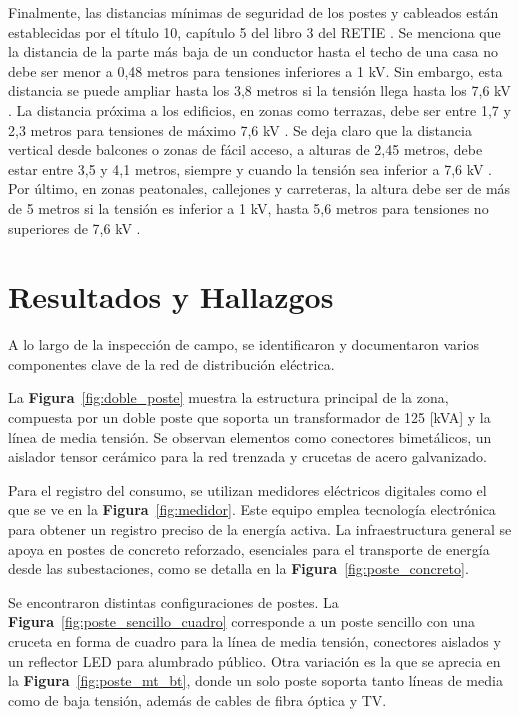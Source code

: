 Finalmente, las distancias mínimas de seguridad de los postes y cableados están establecidas por el título 10, capítulo 5 del libro 3 del RETIE \cite{retie_2013}. Se menciona que la distancia de la parte más baja de un conductor hasta el techo de una casa no debe ser menor a 0,48 metros para tensiones inferiores a 1 kV. Sin embargo, esta distancia se puede ampliar hasta los 3,8 metros si la tensión llega hasta los 7,6 kV \cite{retie_2013}. La distancia próxima a los edificios, en zonas como terrazas, debe ser entre 1,7 y 2,3 metros para tensiones de máximo 7,6 kV \cite{retie_2013}. Se deja claro que la distancia vertical desde balcones o zonas de fácil acceso, a alturas de 2,45 metros, debe estar entre 3,5 y 4,1 metros, siempre y cuando la tensión sea inferior a 7,6 kV \cite{retie_2013}. Por último, en zonas peatonales, callejones y carreteras, la altura debe ser de más de 5 metros si la tensión es inferior a 1 kV, hasta 5,6 metros para tensiones no superiores de 7,6 kV \cite{retie_2013}.


\section{Resultados y Hallazgos}

A lo largo de la inspección de campo, se identificaron y documentaron varios componentes clave de la red de distribución eléctrica. 

La \textbf{Figura}~\ref{fig:doble_poste} muestra la estructura principal de la zona, compuesta por un doble poste que soporta un transformador de 125 [kVA] y la línea de media tensión. Se observan elementos como conectores bimetálicos, un aislador tensor cerámico para la red trenzada y crucetas de acero galvanizado.

Para el registro del consumo, se utilizan medidores eléctricos digitales como el que se ve en la \textbf{Figura}~\ref{fig:medidor}. Este equipo emplea tecnología electrónica para obtener un registro preciso de la energía activa. La infraestructura general se apoya en postes de concreto reforzado, esenciales para el transporte de energía desde las subestaciones, como se detalla en la \textbf{Figura}~\ref{fig:poste_concreto}.

Se encontraron distintas configuraciones de postes. La \textbf{Figura}~\ref{fig:poste_sencillo_cuadro} corresponde a un poste sencillo con una cruceta en forma de cuadro para la línea de media tensión, conectores aislados y un reflector LED para alumbrado público. Otra variación es la que se aprecia en la \textbf{Figura}~\ref{fig:poste_mt_bt}, donde un solo poste soporta tanto líneas de media como de baja tensión, además de cables de fibra óptica y TV. 

